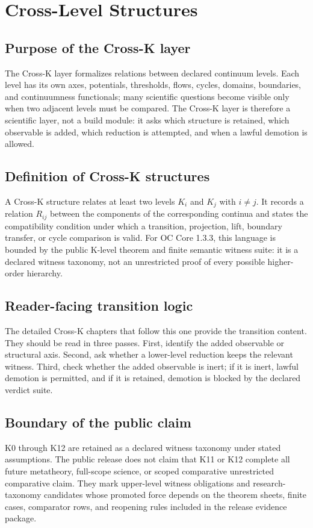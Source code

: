 
\section{Cross-Level Structures}
\label{sec:crossk_master}

\subsection{Purpose of the Cross-K layer}
The Cross-K layer formalizes relations between declared continuum levels. Each
level has its own axes, potentials, thresholds, flows, cycles, domains,
boundaries, and continuumness functionals; many scientific questions become
visible only when two adjacent levels must be compared. The Cross-K layer is
therefore a scientific layer, not a build module: it asks which structure is
retained, which observable is added, which reduction is attempted, and when a
lawful demotion is allowed.

\subsection{Definition of Cross-K structures}
A Cross-K structure relates at least two levels \(K_i\) and \(K_j\) with
\(i \ne j\). It records a relation \(R_{ij}\) between the components of the
corresponding continua and states the compatibility condition under which a
transition, projection, lift, boundary transfer, or cycle comparison is valid.
For OC Core 1.3.3, this language is bounded by the public K-level theorem and
finite semantic witness suite: it is a declared witness taxonomy, not an
unrestricted proof of every possible higher-order hierarchy.

\subsection{Reader-facing transition logic}
The detailed Cross-K chapters that follow this one provide the transition
content. They should be read in three passes. First, identify the added
observable or structural axis. Second, ask whether a lower-level reduction keeps
the relevant witness. Third, check whether the added observable is inert; if it
is inert, lawful demotion is permitted, and if it is retained, demotion is
blocked by the declared verdict suite.

\subsection{Boundary of the public claim}
K0 through K12 are retained as a declared witness taxonomy under stated
assumptions. The public release does not claim that K11 or K12 complete all
future metatheory, full-scope science, or scoped comparative unrestricted comparative claim.
They mark upper-level witness obligations and research-taxonomy candidates
whose promoted force depends on the theorem sheets, finite cases, comparator
rows, and reopening rules included in the release evidence package.
